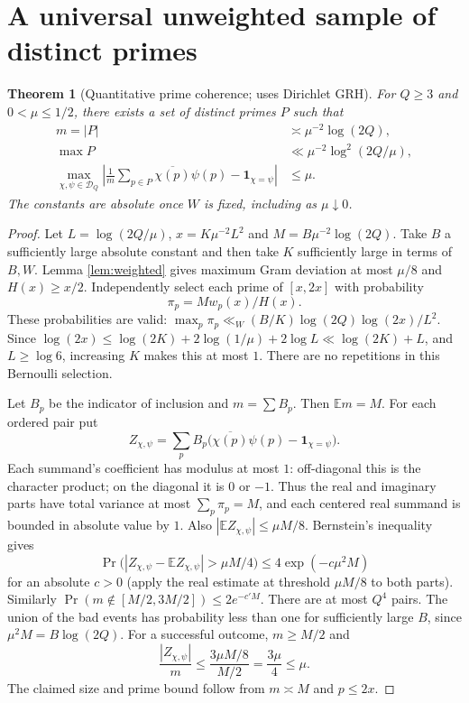 \documentclass[11pt]{article}
\newtheorem{theorem}{Theorem}[section]
\theoremstyle{remark}\newtheorem{remark}[theorem]{Remark}
\newcommand{\D}{\mathcal D}
\newcommand{\abs}[1]{\left|#1\right|}
\newcommand{\one}{\mathbf 1}
\begin{document}
\section{A universal unweighted sample of distinct primes}\label{sec:sampling}
\begin{theorem}[Quantitative prime coherence; uses Dirichlet GRH]\label{thm:gram}
For $Q\ge3$ and $0<\mu\le1/2$, there exists a set of distinct primes $P$ such that
\begin{align}
 m=\abs P&\asymp \mu^{-2}\log(2Q),\label{eq:m}\\
 \max P&\ll \mu^{-2}\log^2(2Q/\mu),\label{eq:x}\\
 \max_{\chi,\psi\in\D_Q}\left|\frac{1}{m}\sum_{p\in P}\overline{\chi(p)}\psi(p)-\one_{\chi=\psi}\right|&\le\mu.\label{eq:gram}
\end{align}
The constants are absolute once $W$ is fixed, including as $\mu\downarrow0$.
\end{theorem}
\begin{proof}
Let $L=\log(2Q/\mu)$, $x=K\mu^{-2}L^2$ and $M=B\mu^{-2}\log(2Q)$. Take $B$ a sufficiently large absolute constant and then take $K$ sufficiently large in terms of $B,W$. Lemma \ref{lem:weighted} gives maximum Gram deviation at most $\mu/8$ and $H(x)\ge x/2$. Independently select each prime of $[x,2x]$ with probability
\[
 \pi_p=Mw_p(x)/H(x).
\]
These probabilities are valid: $\max_p\pi_p\ll_W (B/K)\log(2Q)\log(2x)/L^2$. Since $\log(2x)\le \log(2K)+2\log(1/\mu)+2\log L\ll \log(2K)+L$, and $L\ge\log 6$, increasing $K$ makes this at most $1$. There are no repetitions in this Bernoulli selection.

Let $B_p$ be the indicator of inclusion and $m=\sum B_p$. Then $\mathbb E m=M$. For each ordered pair put
\[
 Z_{\chi,\psi}=\sum_p B_p\bigl(\overline{\chi(p)}\psi(p)-\one_{\chi=\psi}\bigr).
\]
Each summand's coefficient has modulus at most $1$: off-diagonal this is the character product; on the diagonal it is $0$ or $-1$. Thus the real and imaginary parts have total variance at most $\sum_p\pi_p=M$, and each centered real summand is bounded in absolute value by $1$. Also $\abs{\mathbb E Z_{\chi,\psi}}\le\mu M/8$. Bernstein's inequality gives
\[
 \Pr\bigl(\abs{Z_{\chi,\psi}-\mathbb E Z_{\chi,\psi}}>\mu M/4\bigr)
 \le 4\exp(-c\mu^2M)
\]
for an absolute $c>0$ (apply the real estimate at threshold $\mu M/8$ to both parts). Similarly $\Pr(m\notin[M/2,3M/2])\le2e^{-c'M}$. There are at most $Q^4$ pairs. The union of the bad events has probability less than one for sufficiently large $B$, since $\mu^2M=B\log(2Q)$. For a successful outcome, $m\ge M/2$ and
\[
 \frac{\abs{Z_{\chi,\psi}}}{m}\le\frac{3\mu M/8}{M/2}=\frac{3\mu}{4}\le\mu.
\]
The claimed size and prime bound follow from $m\asymp M$ and $p\le2x$.
\end{proof}
\end{document}
